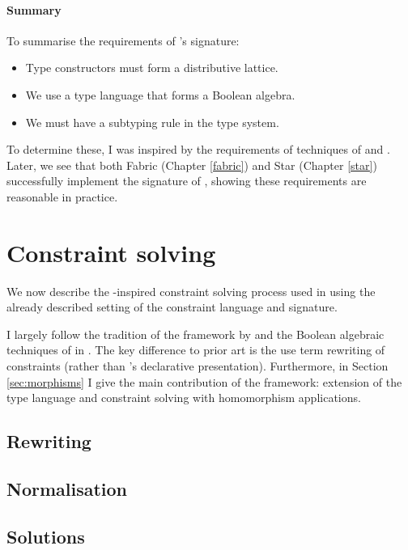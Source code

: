 \paragraph{Summary} To summarise the requirements of \inference{}'s signature: \begin{itemize}
    \item Type constructors must form a distributive lattice.
    \item We use a type language that forms a Boolean algebra.
    \item We must have a subtyping rule in the type system.
\end{itemize} 
To determine these, I was inspired by the requirements of techniques of \textcite{mlsub} and \textcite{mlstruct}.
Later, we see that both Fabric (Chapter \ref{fabric}) and Star (Chapter \ref{star}) successfully implement the signature of \inference{}, showing these requirements are reasonable in practice.

\section{Constraint solving}
\label{sec:constraints}

We now describe the \mlstruct{}-inspired constraint solving process used in \inference{} using the already described setting of the constraint language and signature. 

I largely follow the tradition of the framework by \textcite{pottier-framework} and the Boolean algebraic techniques of \textcite{mlstruct} in \mlstruct{}. The key difference to prior art is the use term rewriting of constraints (rather than \mlstruct{}'s declarative presentation). Furthermore, in Section \ref{sec:morphisms} I give the main contribution of the framework: extension of the type language and constraint solving with homomorphism applications.

\subsection{Rewriting}
\label{subsec:rewriting}

\subsection{Normalisation}
\label{subsec:normalisation}

\subsection{Solutions}
\label{subsec:solutions}

